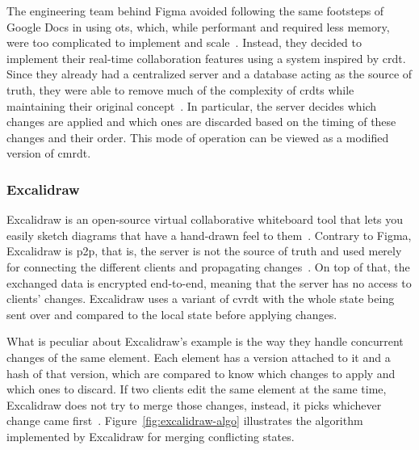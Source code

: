 \begin{toexclude}
  The engineering team behind Figma avoided following the same footsteps of Google Docs in using \acrshort{ot}s, which, while performant and required less memory, were too complicated to implement and scale~\autocite{wallace_how_nodate}.
  Instead, they decided to implement their real-time collaboration features using a system inspired by \acrshort{crdt}.
  Since they already had a centralized server and a database acting as the source of truth, they were able to remove much of the complexity of \acrshort{crdt}s while maintaining their original concept~\autocite{wallace_how_nodate}.
  In particular, the server decides which changes are applied and which ones are discarded based on the timing of these changes and their order.
  This mode of operation can be viewed as a modified version of \acrshort{cmrdt}.


  \subsubsection{Excalidraw}


  Excalidraw is an open-source virtual collaborative whiteboard tool that lets you easily sketch diagrams that have a hand-drawn feel to them~\autocite{noauthor_rethinking_nodate}.
  Contrary to Figma, Excalidraw is \acrfull{p2p}, that is, the server is not the source of truth and used merely for connecting the different clients and propagating changes~\autocite{noauthor_building_nodate}.
  On top of that, the exchanged data is encrypted end-to-end, meaning that the server has no access to clients' changes.
  Excalidraw uses a variant of \acrfull{cvrdt} with the whole state being sent over and compared to the local state before applying changes.


  What is peculiar about Excalidraw's example is the way they handle concurrent changes of the same element. Each element has a version attached to it and a hash of that version, which are compared to know which changes to apply and which ones to discard. If two clients edit the same element at the same time, Excalidraw does not try to merge those changes, instead, it picks whichever change came first~\autocite{noauthor_building_nodate}.
  Figure~\ref{fig:excalidraw-algo} illustrates the algorithm implemented by Excalidraw for merging conflicting states.


\end{toexclude}
